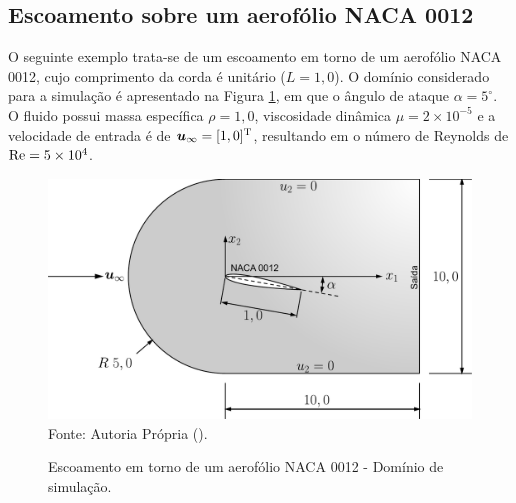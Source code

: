 \newpage
\subsection{Escoamento sobre um aerofólio NACA 0012} \label{ex:NACA0012}

O seguinte exemplo trata-se de um escoamento em torno de um aerofólio NACA 0012, cujo comprimento da corda é unitário ($L=1,0$). O domínio considerado para a simulação é apresentado na Figura \ref{fig:NACA0012}, em que o ângulo de ataque $\alpha=5^{\circ}$. O fluido possui massa específica $\rho=1,0$, viscosidade dinâmica $\mu=2\times10^{-5}$ e a velocidade de entrada é de $\boldsymbol{u}_\infty=[1,0]^\mathrm{T}$, resultando em o número de Reynolds de $\mathrm{Re}=5\times10^4$.

\begin{figure}[h!]
    \centering
    \caption{Escoamento em torno de um aerofólio NACA 0012 - Domínio de simulação.}
    \includegraphics[width=.7\linewidth]{Figuras/NACA0012/NACA0012.pdf}
    \\Fonte: Autoria Própria (\the\year).
    \label{fig:NACA0012}
\end{figure}

